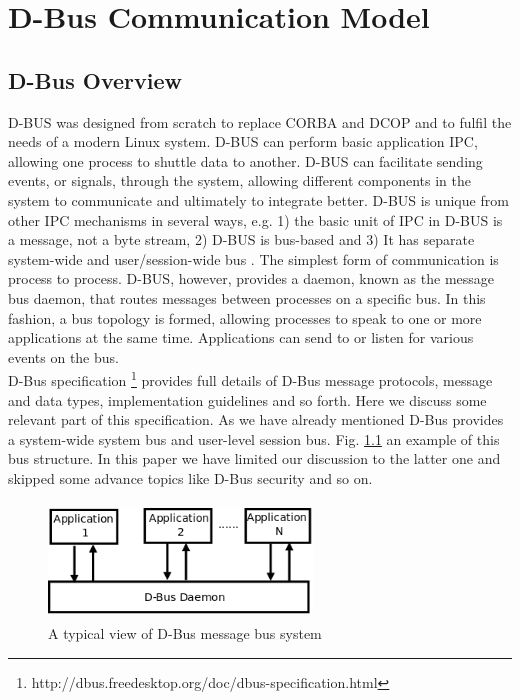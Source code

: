 \documentclass{ifacconf}
\begin{document}
\section{D-Bus Communication Model}
\subsection{D-Bus Overview}
D-BUS was designed from scratch to replace CORBA and DCOP and to fulfil the needs of a modern Linux system. D-BUS can perform basic application IPC, allowing one process to shuttle data to another. D-BUS can facilitate sending events, or signals, through the system, allowing different components in the system to communicate and ultimately to integrate better. D-BUS is unique from other IPC mechanisms in several ways, e.g. 1) the basic unit of IPC in D-BUS is a message, not a byte stream, 2) D-BUS is bus-based and 3) It has separate system-wide and user/session-wide bus  \cite{Love2006} . The simplest form of communication is process to process. D-BUS, however, provides a daemon, known as the message bus daemon, that routes messages between processes on a specific bus. In this fashion, a bus topology is formed, allowing processes to speak to one or more applications at the same time. Applications can send to or listen for various events on the bus.\\
D-Bus specification \footnote{http://dbus.freedesktop.org/doc/dbus-specification.html} provides full details of D-Bus message protocols, message and data types, implementation guidelines and so forth. Here we discuss some relevant part  of this specification.  As we have already mentioned D-Bus provides a system-wide system bus and user-level session bus. Fig. \ref{} an example of this bus structure. In this paper we have limited our discussion to the latter one and skipped some advance topics like D-Bus security and so on.
\begin{figure}
\begin{center}
\includegraphics[width=7cm,height=3.1cm]{./dia-files/dbus-daemon}    %
\caption{A typical view of D-Bus message bus system } 
\label{fig:abstract-arch}
\end{center}
\end{figure}
\end{document}
